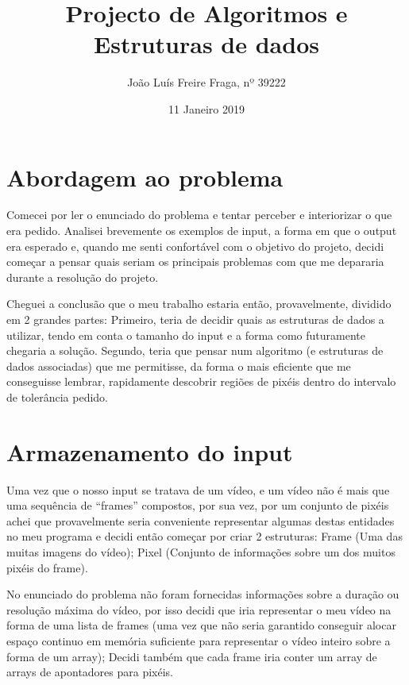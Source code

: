 \documentclass{article}
\begin{document}
\title{Projecto de Algoritmos e Estruturas de dados}
\author{João Luís Freire Fraga, nº 39222}
\date{11 Janeiro 2019}

\clearpage\maketitle
\thispagestyle{empty}
\newpage

\section{Abordagem ao problema}

Comecei por ler o enunciado do problema e tentar perceber e interiorizar o que era pedido. Analisei brevemente os exemplos de input, a forma em que o output era esperado e, quando me senti confortável com o objetivo do projeto, decidi começar a pensar quais seriam os principais problemas com que me depararia durante a resolução do projeto.

Cheguei a conclusão que o meu trabalho estaria então, provavelmente, dividido em 2 grandes partes: Primeiro, teria de decidir quais as estruturas de dados a utilizar, tendo em conta o tamanho do input e a forma como futuramente chegaria a solução. Segundo, teria que pensar num algoritmo (e estruturas de dados associadas) que me permitisse, da forma o mais eficiente que me conseguisse lembrar, rapidamente descobrir regiões de pixéis dentro do intervalo de tolerância pedido.

\section{Armazenamento do input}

Uma vez que o nosso input se tratava de um vídeo, e um vídeo não é mais que uma sequência de “frames” compostos, por sua vez, por um conjunto de pixéis achei que provavelmente seria conveniente representar algumas destas entidades no meu programa e decidi então começar por criar 2 estruturas: Frame (Uma das muitas imagens do vídeo); Pixel (Conjunto de informações sobre um dos muitos pixéis do frame).

No enunciado do problema não foram fornecidas informações sobre a duração ou resolução máxima do vídeo, por isso decidi que iria representar o meu vídeo na forma de uma lista de frames (uma vez que não seria garantido conseguir alocar espaço continuo em memória suficiente para representar o vídeo inteiro sobre a forma de um array); Decidi também que cada frame iria conter um array de arrays de apontadores para pixéis.
\end{document}
